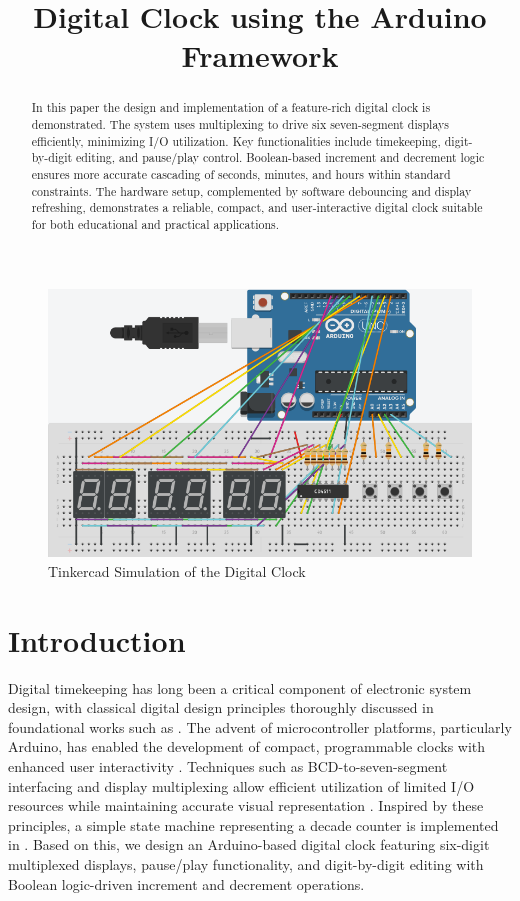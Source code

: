 \documentclass[conference]{IEEEtran}
\title{Digital Clock using the Arduino Framework}
\author{
    \IEEEauthorblockN{Dhawal Saini and G. V. V. Sharma}
    \IEEEauthorblockA{Department of Electrical Engineering\\
    Indian Institute of Technology Hyderabad\\
    Email: gadepall@ee.iith.ac.in}
}
\begin{document}
\maketitle

\begin{abstract}
In this paper the design and implementation of a feature-rich digital clock is demonstrated. The system uses multiplexing to drive six seven-segment displays efficiently, minimizing I/O utilization. Key functionalities include timekeeping, digit-by-digit editing, and pause/play control. Boolean-based increment and decrement logic ensures more accurate cascading of seconds, minutes, and hours within standard constraints. The hardware setup, complemented by software debouncing and display refreshing, demonstrates a reliable, compact, and user-interactive digital clock suitable for both educational and practical applications.
\end{abstract}
\begin{figure}[!ht]
\centering
\includegraphics[width=\columnwidth]{figs/Clock_Tinkercad.png}
\caption{Tinkercad Simulation of the Digital Clock}
\label{fig:tinker}
\end{figure}
\section{Introduction}
Digital timekeeping has long been a critical component of electronic system design, with classical digital design principles thoroughly discussed in foundational works such as \cite{mano2013digital, malvino2017digital, patterson2014computer}. The advent of microcontroller platforms, particularly Arduino, has enabled the development of compact, programmable clocks with enhanced user interactivity \cite{arduino_reference}. Techniques such as BCD-to-seven-segment interfacing and display multiplexing allow efficient utilization of limited I/O resources while maintaining accurate visual representation \cite{ti7447datasheet}. Inspired by these principles, a simple state machine representing a decade counter is  implemented in \cite{ddta}.  Based 
on this, 
we design an Arduino-based digital clock featuring six-digit multiplexed displays, pause/play functionality, and digit-by-digit editing with Boolean logic-driven increment and decrement operations.
\end{document}
